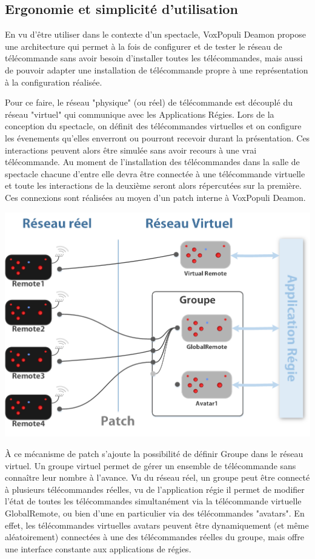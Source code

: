 \documentclass{Rapport}
\begin{document}
\subsection*{Ergonomie et simplicité d'utilisation}

En vu d'être utiliser dans le contexte d'un spectacle, VoxPopuli Deamon propose une architecture qui permet à la fois de configurer et de tester le réseau de télécommande sans avoir besoin d'installer toutes les télécommandes, mais aussi de pouvoir adapter une installation de télécommande propre à une représentation à la configuration réalisée.

Pour ce faire, le réseau "physique" (ou réel) de télécommande est découplé du réseau "virtuel" qui communique avec les Applications Régies. Lors de la conception du spectacle, on définit des télécommandes virtuelles et on configure les évenements qu'elles enverront ou pourront recevoir durant la présentation. Ces interactions peuvent alors être simulée sans avoir recours à une vrai télécommande. Au moment de l'installation des télécommandes dans la salle de spectacle chacune d'entre elle devra être connectée à une télécommande virtuelle et toute les interactions de la deuxième seront alors répercutées sur la première. Ces connexions sont réalisées au moyen d'un patch interne à VoxPopuli Deamon.

\includegraphics[width=0.8\columnwidth]{rsc/diaReseau}

À ce mécanisme de patch s'ajoute la possibilité de définir Groupe dans le réseau virtuel. Un groupe virtuel permet de gérer un ensemble de télécommande sans connaître leur nombre à l'avance. Vu du réseau réel, un groupe peut être connecté à plusieurs télécommandes réelles, vu de l'application régie il permet de modifier l'état de  toutes les télécommandes simultanément via la télécommande virtuelle GlobalRemote, ou bien d'une en particulier via des télécommandes "avatars". En effet, les télécommandes virtuelles avatars peuvent être dynamiquement (et même aléatoirement) connectées à une des télécommandes réelles du groupe, mais offre une interface constante aux applications de régies.
\end{document}

